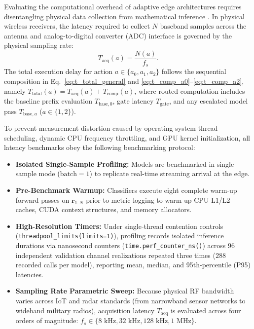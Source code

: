 Evaluating the computational overhead of adaptive edge architectures requires disentangling physical data collection from mathematical inference \cite{guo2025fewer, liu2026beacon}. In physical wireless receivers, the latency required to collect $N$ baseband samples across the antenna and analog-to-digital converter (ADC) interface is governed by the physical sampling rate:
\begin{equation}
    T_{\text{acq}}(a) = \frac{N(a)}{f_s}.
\end{equation}
The total execution delay for action $a \in \{a_0, a_1, a_2\}$ follows the sequential composition in Eq.~\eqref{eq:t_total_general} and \eqref{eq:t_comp_a0}--\eqref{eq:t_comp_a2}, namely $T_{\text{total}}(a) = T_{\text{acq}}(a) + T_{\text{comp}}(a)$, where routed computation includes the baseline prefix evaluation $T_{\text{base},0}$, gate latency $T_{\text{gate}}$, and any escalated model pass $T_{\text{base},a}$ ($a \in \{1,2\}$).

To prevent measurement distortion caused by operating system thread scheduling, dynamic CPU frequency throttling, and GPU kernel initialization, all latency benchmarks obey the following benchmarking protocol:
\begin{itemize}
    \item \textbf{Isolated Single-Sample Profiling:} Models are benchmarked in single-sample mode ($\text{batch}=1$) to replicate real-time streaming arrival at the edge.
    \item \textbf{Pre-Benchmark Warmup:} Classifiers execute eight complete warm-up forward passes on $\mathbf{r}_{1:N}$ prior to metric logging to warm up CPU L1/L2 caches, CUDA context structures, and memory allocators.
    \item \textbf{High-Resolution Timers:} Under single-thread contention controls (\texttt{threadpool\_limits(limits=1)}), profiling records isolated inference durations via nanosecond counters (\texttt{time.perf\_counter\_ns()}) across $96$ independent validation channel realizations repeated three times ($288$ recorded calls per model), reporting mean, median, and 95th-percentile (P95) latencies.
    \item \textbf{Sampling Rate Parametric Sweep:} Because physical RF bandwidth varies across IoT and radar standards (from narrowband sensor networks to wideband military radios), acquisition latency $T_{\text{acq}}$ is evaluated across four orders of magnitude: $f_s \in \{8\text{ kHz}, 32\text{ kHz}, 128\text{ kHz}, 1\text{ MHz}\}$.
\end{itemize}

